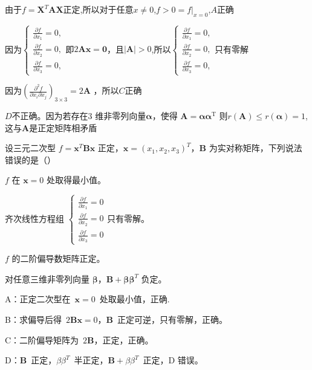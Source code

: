 \begin{solution}
    由于\(f = \mathbf{X}^T \mathbf{A} \mathbf{X}\)正定,所以对于任意\(x \neq 0\),\(f>0
    = f\big|_{x=0} \),\(A\)正确\par
    因为\(\begin{cases}
        \frac{\partial f}{\partial x_1} = 0,\\
        \frac{\partial f}{\partial x_2} = 0,\\
        \frac{\partial f}{\partial x_3} = 0,
    \end{cases}\)即\(2 \mathbf{Ax = 0}\)，且\(
        |\mathbf{A}| >0
   \),所以\(  \begin{cases}
 
        \frac{\partial f}{\partial x_1} = 0,\\
        \frac{\partial f}{\partial x_2} = 0,\\
        \frac{\partial f}{\partial x_3} = 0,
    \end{cases}\)只有零解\par
    因为\(\left( \frac{\partial^2 f}{\partial x_i \partial x_j}\right)_{3\times3} = 2 \mathbf{A} \)
    ，所以\(C\)正确\par
    \(D\)不正确。因为若存在$ 3$ 维非零列向量$\mathbf{\alpha}$，使得 $ \mathbf{A}=\mathbf{\alpha} \mathbf{\alpha}^{\mathrm{T}}$  
    则\(r(\mathbf{A}) \leq r(\mathbf{\alpha}) = 1\),这与\(\mathbf{A}\)是正定矩阵相矛盾
\end{solution}
\begin{question}
    设三元二次型 \( f = \mathbf{x}^T\mathbf{B}\mathbf{x} \) 正定，\( \mathbf{x} = (x_1, x_2, x_3)^T \)，\( \mathbf{B} \) 为实对称矩阵，下列说法错误的是（\quad）
    \begin{choices}
        \item \( f \) 在 \( \mathbf{x} = 0 \) 处取得最小值。
        \item 齐次线性方程组 
        \(
        \begin{cases}
        \frac{\partial f}{\partial x_1} = 0 \\
        \frac{\partial f}{\partial x_2} = 0 \\
        \frac{\partial f}{\partial x_3} = 0
        \end{cases}
        \)只有零解。 
        \item \( f \) 的二阶偏导数矩阵正定。
        \item 对任意三维非零列向量 \( \bm{\beta} \)，\( \mathbf{B} + \bm{\beta}\bm{\beta}^T \) 负定。
    \end{choices}
\end{question}
\begin{solution}
    A：正定二次型在 \(\mathbf{x}=0\) 处取最小值，正确.\par B：求偏导后得 \(2\mathbf{B}\mathbf{x}=0\)，\(\mathbf{B}\) 正定可逆，只有零解，正确。
    \par C：二阶偏导矩阵为 \(2\mathbf{B}\)，正定，正确。\par
    D：\(\mathbf{B}\) 正定，\({\beta} {\beta}^T\) 半正定，\(\mathbf{B} + {\beta} {\beta}^T\) 正定，D 错误。
\end{solution}

